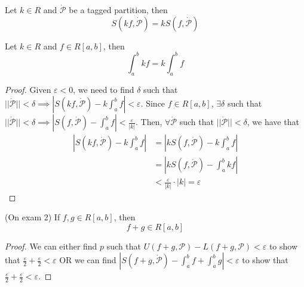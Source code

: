 \begin{lemma}
    Let $k \in R$ and $\dot{\mathcal{P}}$ be a tagged partition, then $$S(kf, \dot{\mathcal{P}}) = kS(f, \dot{\mathcal{P}})$$
\end{lemma}
\begin{theorem}
    Let $k \in R$ and $f \in R[a, b]$, then $$\int_a^b kf = k \int_a^b f$$
\end{theorem}
\begin{proof}
    Given $\varepsilon < 0$, we need to find $\delta$ such that $||\dot{\mathcal{P}}|| < \delta \implies |S(kf, \dot{\mathcal{P}}) - k \int_a^b f| < \varepsilon$. Since $f \in R[a, b]$, $\exists \delta$ such that $||\dot{\mathcal{P}}|| < \delta \implies |S(f, \dot{\mathcal{P}}) - \int_a^b f| < \frac{\varepsilon}{|k|}$. Then, $\forall \dot{\mathcal{P}}$ such that $||\dot{\mathcal{P}}|| < \delta$, we have that
    \begin{align*}
        |S(kf, \dot{\mathcal{P}}) - k \int_a^b f| &= |kS(f, \dot{\mathcal{P}}) - k \int_a^b f| \\
        &= |kS(f, \dot{\mathcal{P}}) - \int_a^b kf| \\
        &< \frac{\varepsilon}{|k|} \cdot |k| = \varepsilon
    \end{align*}
\end{proof}

\begin{theorem}
    (On exam 2) If $f, g \in R[a, b]$, then $$f + g \in R[a, b]$$
\end{theorem}
\begin{proof}
    We can either find $p$ such that $U(f + g, \mathcal{P}) - L(f + g, \mathcal{P}) < \varepsilon$ to show that $\frac{\varepsilon}{2} + \frac{\varepsilon}{2} < \varepsilon$ OR we can find $|S(f + g, \dot{\mathcal{P}}) - \int_a^b f + \int_a^b g| < \varepsilon$ to show that $\frac{\varepsilon}{2} + \frac{\varepsilon}{2} < \varepsilon$.
\end{proof}